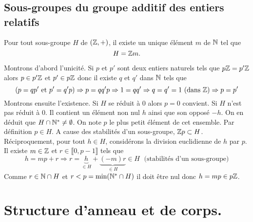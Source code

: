 \subsection{Sous-groupes du groupe additif des entiers relatifs}
\begin{prop}
 Pour tout sous-groupe $H$ de $(\mathbb{Z},+)$, il existe un unique élément $m$ de $\mathbb{N}$ tel que 
\begin{displaymath}
 H = \mathbb{Z} m .
\end{displaymath}
\end{prop}
\begin{demo}
Montrons d'abord l'unicité.\newline
Si $p$ et $p'$ sont deux entiers naturels tels que $p\mathbb{Z} = p'\mathbb{Z}$ alors $p\in p'\mathbb{Z}$ et $p'\in p\mathbb{Z}$ donc il existe $q$ et $q'$ dans $\mathbb{N}$ tels que 
\begin{displaymath}
  \left( p = qp' \text{ et } p' = q' p\right) \Rightarrow p =qq'p \Rightarrow 1 = qq' \Rightarrow q=q'=1 \text{ (dans $\mathbb{Z}$)}\Rightarrow p = p'
\end{displaymath}
Montrons ensuite l'existence.\newline
Si $H$ se réduit à $0$ alors $p=0$ convient.\newline
Si $H$ n'est pas réduit à $0$. Il contient un élément non nul $h$ ainsi que son opposé $-h$. On en déduit que $H\cap \mathbb{N}^* \neq \emptyset$. On note $p$ le plus petit élément de cet ensemble. Par définition $p\in H$. A cause des stabilités d'un sous-groupe, $\mathbb{Z} p \subset H$.\newline
Réciproquement, pour tout $h\in H$, considérons la division euclidienne de $h$ par $p$. Il existe $m\in \mathbb{Z}$ et $r\in \llbracket 0 , p-1 \rrbracket$ tels que 
\begin{displaymath}
  h = mp +r \Rightarrow r = \underset{\in H}{\underbrace{h}} + \underset{\in H}{\underbrace{(-m)r}} \in H \; \text{ (stabilités d'un sous-groupe)}
\end{displaymath}
Comme $r\in \mathbb{N} \cap H$ et $r<p=\min(\mathbb{N}^* \cap H)$ il doit être nul donc $h=mp \in p\mathbb{Z}$.
\end{demo}

\section{Structure d'anneau et de corps.}
